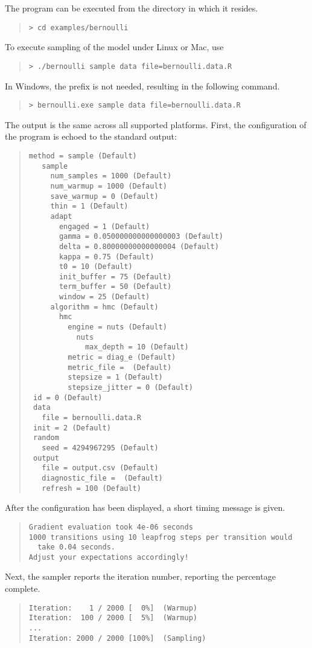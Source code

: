 The program can be executed from the directory in which it resides.
%
\begin{quote}
\begin{Verbatim}[fontshape=sl]
> cd examples/bernoulli
\end{Verbatim}
\end{quote}
%
To execute sampling of the model under Linux or Mac, use
%
\begin{quote}
\begin{Verbatim}[fontshape=sl]
> ./bernoulli sample data file=bernoulli.data.R
\end{Verbatim}
\end{quote}
%
In Windows, the  prefix is not needed, resulting in the
following command.
%
\begin{quote}
\begin{Verbatim}[fontshape=sl]
> bernoulli.exe sample data file=bernoulli.data.R
\end{Verbatim}
\end{quote}
%
The output is the same across all supported platforms.  First, the
configuration of the program is echoed to the standard output:
%
\begin{quote}
\begin{Verbatim}[fontsize=\small]
 method = sample (Default)
   sample
     num_samples = 1000 (Default)
     num_warmup = 1000 (Default)
     save_warmup = 0 (Default)
     thin = 1 (Default)
     adapt
       engaged = 1 (Default)
       gamma = 0.050000000000000003 (Default)
       delta = 0.80000000000000004 (Default)
       kappa = 0.75 (Default)
       t0 = 10 (Default)
       init_buffer = 75 (Default)
       term_buffer = 50 (Default)
       window = 25 (Default)
     algorithm = hmc (Default)
       hmc
         engine = nuts (Default)
           nuts
             max_depth = 10 (Default)
         metric = diag_e (Default)
         metric_file =  (Default)
         stepsize = 1 (Default)
         stepsize_jitter = 0 (Default)
 id = 0 (Default)
 data
   file = bernoulli.data.R
 init = 2 (Default)
 random
   seed = 4294967295 (Default)
 output
   file = output.csv (Default)
   diagnostic_file =  (Default)
   refresh = 100 (Default)
\end{Verbatim}
\end{quote}
%
After the configuration has been displayed, a short timing message is
given.
%
\begin{quote}
\begin{Verbatim}[fontsize=\small]
Gradient evaluation took 4e-06 seconds
1000 transitions using 10 leapfrog steps per transition would
  take 0.04 seconds.
Adjust your expectations accordingly!
\end{Verbatim}
\end{quote}
%
Next, the sampler reports the iteration number, reporting the
percentage complete.
%
\begin{quote}
\begin{Verbatim}[fontsize=\small]
Iteration:    1 / 2000 [  0%]  (Warmup)
Iteration:  100 / 2000 [  5%]  (Warmup)
...
Iteration: 2000 / 2000 [100%]  (Sampling)
\end{Verbatim}
\end{quote}

